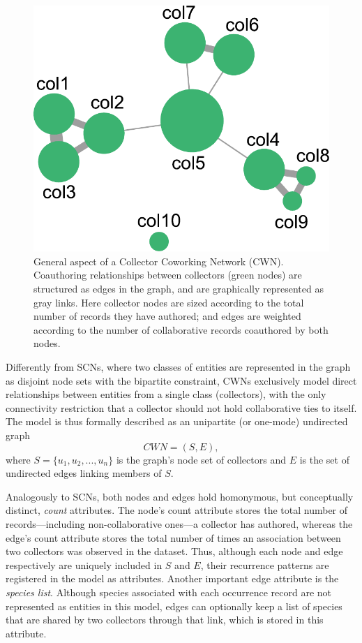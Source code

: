 {  \begin{figure}[h!]
  	\centering
    \includegraphics[width=.4\linewidth]{figures/network_models/cwn_generalaspect.pdf}
    \caption[General illustration of a Collector Coworking Network (CWN).]{General aspect of a Collector Coworking Network (CWN). Coauthoring relationships between collectors (green nodes) are structured as edges in the graph, and are graphically represented as gray links.
    Here collector nodes are sized according to the total number of records they have authored; and edges are weighted according to the number of collaborative records coauthored by both nodes.}
    \label{fig:cwn_general}
  \end{figure}

Differently from SCNs, where two classes of entities are represented in the graph as disjoint node sets with the bipartite constraint, CWNs exclusively model direct relationships between entities from a single class (collectors), with the only connectivity restriction that a collector should not hold collaborative ties to itself.
The model is thus formally described as an unipartite (or one-mode) undirected graph
$$CWN = (S,E),$$
where $S=\{u_1,u_2,...,u_n\}$ is the graph's node set of collectors and $E$ is the set of undirected edges linking members of $S$.

Analogously to SCNs, both nodes and edges hold homonymous, but conceptually distinct, \textit{count} attributes.
The node's count attribute stores the total number of records---including non-collaborative ones---a collector has authored, whereas
the edge's count attribute stores the total number of times an association between two collectors was observed in the dataset. Thus, although each node and edge respectively are uniquely included in $S$ and $E$, their recurrence patterns are registered in the model as attributes.
Another important edge attribute is the \textit{species list}. Although species associated with each occurrence record are not represented as entities in this model, edges can optionally keep a list of species that are shared by two collectors through that link, which is stored in this attribute.

}
